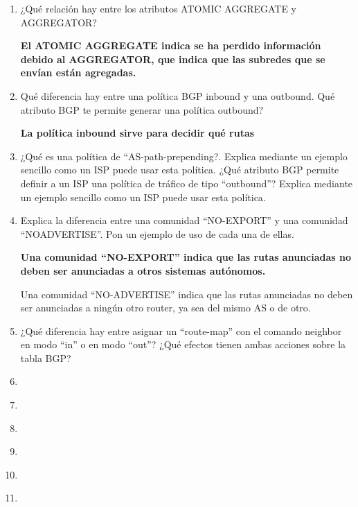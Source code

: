 \documentclass[a4paper]{article}
\begin{document}
\begin{enumerate}
{            Con esto se consigue que el router transmita a través de BGP rutas que no se han conocido mediante BGP.
        }
        \item ¿Qué relación hay entre los atributos ATOMIC AGGREGATE y AGGREGATOR?

        {\bfseries
            El ATOMIC AGGREGATE indica se ha perdido información debido al AGGREGATOR, que indica que las subredes que se envían están agregadas.
        }
        \item Qué diferencia hay entre una política BGP inbound y una outbound. Qué atributo
        BGP te permite generar una política outbound?

        {\bfseries
            La política inbound sirve para decidir qué rutas
        }
        \item ¿Qué es una política de “AS-path-prepending?. Explica mediante un ejemplo
        sencillo como un ISP puede usar esta política. ¿Qué atributo BGP permite definir a un ISP una
        política de tráfico de tipo “outbound”? Explica mediante un ejemplo sencillo como un ISP puede
        usar esta política.

        {\bfseries

        }
        \item Explica la diferencia entre una comunidad “NO-EXPORT” y una comunidad “NOADVERTISE”. Pon un ejemplo de uso de cada una de ellas.

        {\bfseries
            Una comunidad ``NO-EXPORT'' indica que las rutas anunciadas no deben ser anunciadas a otros sistemas autónomos.

            Una comunidad ``NO-ADVERTISE'' indica que las rutas anunciadas no deben ser anunciadas a ningún otro router, ya sea del mismo AS o de otro.
        }
        \item ¿Qué diferencia hay entre asignar un “route-map” con el comando neighbor en
        modo “in” o en modo “out”? ¿Qué efectos tienen ambas acciones sobre la tabla BGP?

        {\bfseries
            
        }
        \item

        {\bfseries

        }
        \item

        {\bfseries

        }
        \item

        {\bfseries

        }
        \item

        {\bfseries

        }
        \item

        {\bfseries

        }
        \item

        {\bfseries

        }
    \end{enumerate}
\end{document}
